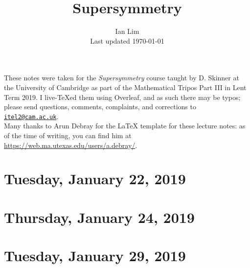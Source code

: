 \documentclass[reqno]{amsart}
\begin{document}
\title{Supersymmetry}
\author{Ian Lim\\ Last updated \today}
\maketitle
{\small\noindent These notes were taken for the \textit{Supersymmetry} course taught by D. Skinner at the University of Cambridge as part of the Mathematical Tripos Part III in Lent Term 2019. I live-\TeX ed them using Overleaf, and as such there may be typos; please send questions, comments, complaints, and corrections to 
\href{mailto:itel2@cam.ac.uk?subject=SUSY\%20Lecture\%20Notes}{\texttt{itel2@cam.ac.uk}}.\\
Many thanks to Arun Debray for the {\LaTeX} template for these lecture notes: as of the time of writing, you can find him at \url{https://web.ma.utexas.edu/users/a.debray/}.}

\tableofcontents

\section{Tuesday, January 22, 2019}
    

\section{Thursday, January 24, 2019}
    

\section{Tuesday, January 29, 2019}
    
\end{document}
